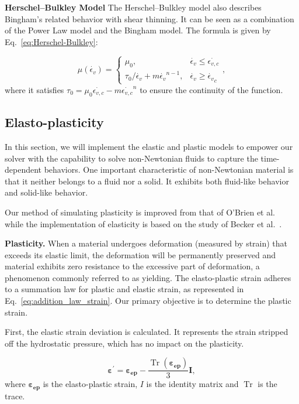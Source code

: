 \documentclass[10pt,journal,compsoc]{IEEEtran}
\begin{document}
\textbf{Herschel–Bulkley Model}
The Herschel–Bulkley model also describes Bingham's related behavior with shear thinning. It can be seen as a combination of the Power Law model and the Bingham model. The formula is given by Eq.~\ref{eq:Herschel-Bulkley}:


\begin{equation}
	\mu(\dot{\epsilon_v})= \begin{cases}\mu_0, & \dot{\epsilon_v} \leq \dot{\epsilon_{v,c}} \\ \tau_0/\dot{\epsilon_v}+m\dot{\epsilon_v}^{n-1}, & \dot{\epsilon_v} \geq \dot{\epsilon_v}_c\end{cases},
	\label{eq:Herschel-Bulkley}
\end{equation}
where it satisfies $\tau_0 = \mu_0 \dot{\epsilon_{v,c}} - m \dot{\epsilon_{v,c}}^n$ to ensure the continuity of the function.

\subsection{Elasto-plasticity}\label{sec:Elasticity-Plasticity}

In this section, we will implement the elastic and plastic models to empower our solver with the capability to solve non-Newtonian fluids to capture the time-dependent behaviors. One important characteristic of non-Newtonian material is that it neither belongs to a fluid nor a solid. It exhibits both fluid-like behavior and solid-like behavior.

Our method of simulating plasticity is improved from that of O'Brien et al.~\cite{OBrien2002} while the implementation of elasticity is based on the study of Becker et al.~\cite{Becker2009}.



\textbf{Plasticity.}\label{sec:plasticity}
When a material undergoes deformation (measured by strain) that exceeds its elastic limit, the deformation will be permanently preserved and material exhibits zero resistance to the excessive part of deformation, a phenomenon commonly referred to as yielding. The elasto-plastic strain adheres to a summation law for plastic and elastic strain, as represented in Eq.~\ref{eq:addition_law_strain}. Our primary objective is to determine the plastic strain.


First, the elastic strain deviation is calculated. It represents the strain stripped off the hydrostatic pressure, which has no impact on the plasticity.

\begin{equation}
	\mathbf{\varepsilon}^{\prime}=\mathbf{{ \varepsilon_{ep}}}-\frac{\operatorname{Tr}\left(\mathbf{{ \varepsilon_{ep}}}\right)}{3} \mathbf{I},\label{eq:elastic strain}
\end{equation}
where $\mathbf{{ \varepsilon_{ep}}}$ is the elasto-plastic strain, $I$ is the identity matrix and $\operatorname{Tr}$ is the trace.
\end{document}
